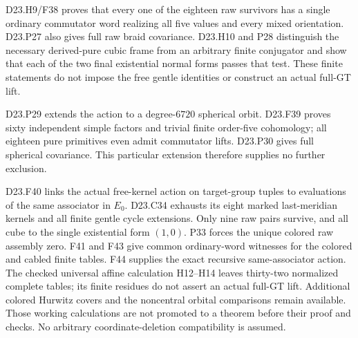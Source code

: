 \documentclass[11pt]{article}
\begin{document}
D23.H9/F38 proves that every one of the eighteen raw survivors
has a single ordinary commutator word realizing all five values
and every mixed orientation. D23.P27 also gives full raw braid
covariance. D23.H10 and P28 distinguish the necessary derived-pure
cubic frame from an arbitrary finite conjugator and show that
each of the two final existential normal forms passes that test.
These finite statements do not impose the free gentle identities
or construct an actual full-GT lift.

D23.P29 extends the action to a degree-$6720$ spherical orbit.
D23.F39 proves sixty independent simple factors and trivial
finite order-five cohomology; all eighteen pure primitives even
admit commutator lifts. D23.P30 gives full spherical covariance.
This particular extension therefore supplies no further exclusion.

D23.F40 links the actual free-kernel action on target-group
tuples to evaluations of the same associator in $E_0$. D23.C34
exhausts its eight marked last-meridian kernels and all finite
gentle cycle extensions. Only nine raw pairs survive, and all
cube to the single existential form $(1,0)$. P33 forces the unique colored raw assembly zero. F41 and F43 give
common ordinary-word witnesses for the colored and cabled finite tables.
F44 supplies the exact recursive same-associator action. The checked universal
affine calculation H12--H14 leaves thirty-two normalized complete tables; its finite residues do not assert an actual full-GT lift.
Additional colored Hurwitz covers and the noncentral orbital
comparisons remain available. Those working calculations are not
promoted to a theorem before their proof and checks. No arbitrary
coordinate-deletion compatibility is assumed.
\end{document}
